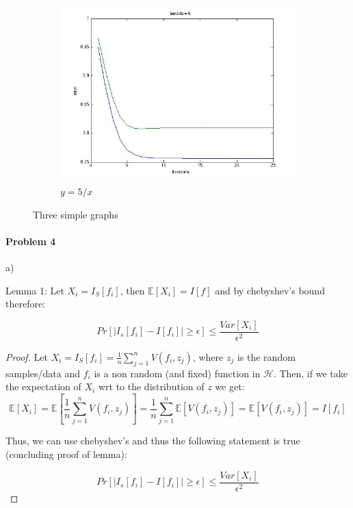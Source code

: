 \documentclass[12pt]{report}
\begin{document}
\begin{figure}
\begin{subfigure}[b]{0.3\textwidth}
        \centering
        \includegraphics[width=\textwidth]{l6.jpg}
        \caption{$y=5/x$}
        \label{fig:five over x}
    \end{subfigure}
    \caption{Three simple graphs}
    \label{fig:three graphs}
\end{figure}

\paragraph{Problem 4}
a)


Lemma 1: Let $X_i = I_S[f_i]$, then $\mathbb{E}[X_i] = I[f]$ and by chebyshev's bound therefore:

$$ Pr[ | I_s[f_i] - I[f_i] | \geq \epsilon ] \leq \frac{ Var[X_i] }{ \epsilon^2 } $$

\begin{proof}
Let $X_i = I_S[f_i] = \frac{1}{n} \sum^{n}_{j=1} V(f_i, z_j)$, where $z_j$ is the random samples/data and $f_i$ is a non random (and fixed) function in $\mathcal{H}$. Then, if we take the expectation of $X_i$ wrt to the distribution of $z$ we get:
$$\mathbb{E}[X_i]  = \mathbb{E}[\frac{1}{n} \sum^{n}_{j=1} V(f_i, z_j)] = \frac{1}{n} \sum^{n}_{j=1} \mathbb{E}[V(f_i, z_j)] =  \mathbb{E}[V(f_i, z_j)] = I[f_i]$$

Thus, we can use chebyshev's and thus the following statement is true (concluding proof of lemma):

$$ Pr[ | I_s[f_i] - I[f_i] | \geq \epsilon ] \leq \frac{ Var[X_i] }{ \epsilon^2 } $$

\end{proof}
\end{document}
